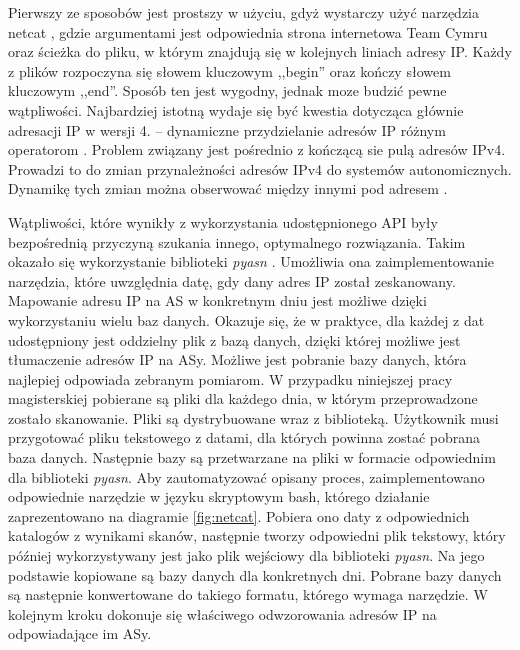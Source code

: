 Pierwszy ze sposobów jest prostszy w użyciu, gdyż wystarczy użyć narzędzia netcat \cite{netcat}, gdzie argumentami jest odpowiednia
strona internetowa Team Cymru \cite{cymru} oraz ścieżka do pliku, w którym znajdują się w kolejnych liniach adresy IP. Każdy z plików
rozpoczyna się słowem kluczowym ,,begin'' oraz kończy słowem kluczowym ,,end''. Sposób ten jest wygodny, jednak moze budzić pewne
wątpliwości. Najbardziej istotną wydaje się być kwestia dotycząca głównie adresacji IP w wersji 4. -- dynamiczne przydzielanie adresów
IP różnym operatorom \cite{RFC2050}. Problem związany jest pośrednio z kończącą sie pulą adresów IPv4. Prowadzi to do zmian przynależności
adresów IPv4 do systemów autonomicznych. Dynamikę tych zmian można obserwować między innymi pod adresem \cite{cidr_report}.

Wątpliwości, które wynikły z wykorzystania udostępnionego API były bezpośrednią przyczyną szukania innego, optymalnego rozwiązania.
Takim okazało się wykorzystanie biblioteki \textit{pyasn} \cite{pyasn}. Umożliwia ona zaimplementowanie narzędzia, które uwzględnia
datę, gdy dany adres IP został zeskanowany. Mapowanie adresu IP na AS w konkretnym dniu jest możliwe dzięki wykorzystaniu wielu baz
danych. Okazuje się, że w praktyce, dla każdej z dat udostępniony jest oddzielny plik z bazą danych, dzięki której możliwe jest
tłumaczenie adresów IP na ASy. Możliwe jest pobranie bazy danych, która najlepiej odpowiada zebranym pomiarom. W przypadku niniejszej
pracy magisterskiej pobierane są pliki dla każdego dnia, w którym przeprowadzone zostało skanowanie. Pliki są dystrybuowane wraz z
biblioteką. Użytkownik musi przygotować pliku tekstowego z datami, dla których powinna zostać
pobrana baza danych. Następnie bazy są przetwarzane na pliki w formacie odpowiednim dla biblioteki \textit{pyasn}. Aby zautomatyzować
opisany proces, zaimplementowano odpowiednie narzędzie w języku skryptowym bash, którego działanie zaprezentowano na diagramie
\ref{fig:netcat}. Pobiera ono daty z odpowiednich katalogów z wynikami
skanów, następnie tworzy odpowiedni plik tekstowy, który później wykorzystywany jest jako plik wejściowy dla biblioteki \textit{pyasn}.
Na jego podstawie kopiowane są bazy danych dla konkretnych dni. Pobrane bazy danych są następnie konwertowane do takiego formatu,
którego wymaga narzędzie. W kolejnym kroku dokonuje się właściwego odwzorowania adresów IP na odpowiadające im ASy.
